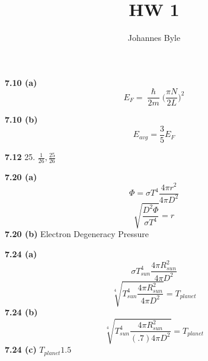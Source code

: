 \documentclass{article}
\begin{document}
\title{HW 1}
\author{Johannes Byle}
\maketitle

\textbf{7.10 (a)}\\
$$E_F=\frac{\hslash}{2m}\Big(\frac{\pi N}{2L}\Big)^2$$

\textbf{7.10 (b)}\\
$$E_{avg}=\frac{3}{5}E_F$$

\textbf{7.12} 25. $\frac{1}{26}, \frac{25}{26}$ 

\textbf{7.20 (a)}
$$\Phi=\sigma T^4\frac{4\pi r^2}{4\pi D^2}$$
$$\sqrt{\frac{D^2\Phi}{\sigma T^4}}=r$$
\textbf{7.20 (b)}
Electron Degeneracy Pressure

\textbf{7.24 (a)}
$$\sigma T_{sun}^4\frac{4\pi R_{sun}^2}{4\pi D^2}$$
$$\sqrt[4]{T_{sun}^4\frac{4\pi R_{sun}^2}{4\pi D^2}}=T_{planet}$$
\textbf{7.24 (b)}
$$\sqrt[4]{T_{sun}^4\frac{4\pi R_{sun}^2}{(.7)4\pi D^2}}=T_{planet}$$
\textbf{7.24 (c)} $T_{planet}1.5$
\end{document}
